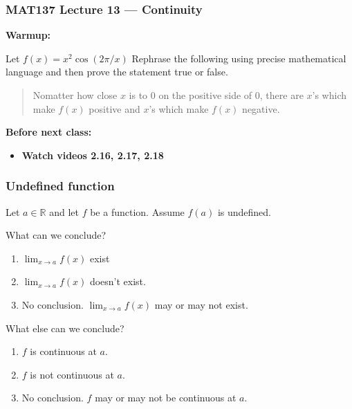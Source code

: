 \documentclass[14pt]{beamer}
\newcommand {\DS} [1] {${\displaystyle #1}$}
\newcommand {\R}{\mathbb{R}}
\newcommand{\setsize}[1]{\fontsize{#1}{#1}\selectfont} %
\newcommand{\smallerfont}{\setsize{13}} %
\begin{document}
\begin{frame}
\frametitle{MAT137 Lecture 13 --- Continuity}
	{\bf Warmup:}
	
	Let $f(x)=x^2\cos(2\pi/x)$
	Rephrase the following using precise mathematical language and then prove the statement true or false.

	\bigskip
	\begin{quote}
		Nomatter how close $x$ is to $0$ on the positive side of $0$, there are $x$'s which
		make $f(x)$ positive and $x$'s which make $f(x)$ negative.
	\end{quote}

	\vfill

	{\bf Before next class:}
		\begin{itemize} \normalsize
			\item {\bf Watch videos 2.16, 2.17, 2.18 }
		\end{itemize}
	\vfill

\end{frame}

\begin{frame}[t]
	\frametitle{Undefined function}
	\smallerfont
	Let $a \in \R$ and let $f$ be a function.   Assume $f(a)$ is undefined.

	\vfill

	\begin{block}{What can we conclude?}
		\begin{enumerate}
			\item  \DS{\lim_{x \to a} f(x)} exist
			\item  \DS{\lim_{x \to a} f(x)} doesn't exist.
			\item   No conclusion.  \DS{\lim_{x \to a} f(x)} may or may not exist.
		\end{enumerate}
	\end{block}

	\vfill

	\begin{block}{What else can we conclude?}
		\begin{enumerate} \addtocounter{enumi}{3}
			\item  $f$ is continuous at $a$.
			\item  $f$ is not continuous at $a$.
			\item  No conclusion. $f$ may or may not be continuous at $a$.
		\end{enumerate}
	\end{block}

	\vfill
	
\end{frame}
\end{document}
